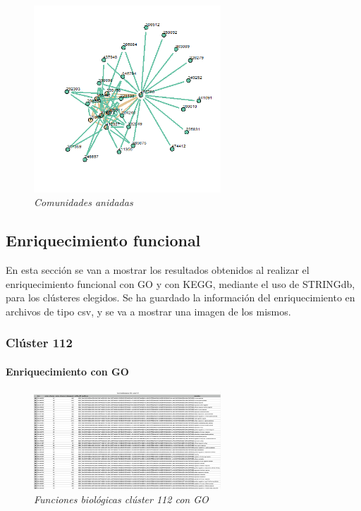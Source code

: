 \begin{figure}
	\centering
	\includegraphics[width=70mm,scale=1.2]{figures/nested_comm.png}
	\caption{\textit{Comunidades anidadas}}
\end{figure}

\subsection{Enriquecimiento funcional}

En esta sección se van a mostrar los resultados obtenidos al realizar el enriquecimiento funcional con GO y con KEGG, mediante el uso de STRINGdb, para los clústeres elegidos.
Se ha guardado la información del enriquecimiento en archivos de tipo csv, y se va a mostrar una imagen de los mismos.

\subsubsection{Clúster 112}

\paragraph{Enriquecimiento con GO}

\begin{figure}
	\centering
	\includegraphics[width=70mm,scale=1.2]{figures/cluster112_GO.png}
	\caption{\textit{Funciones biológicas clúster 112 con GO}}
\end{figure}

